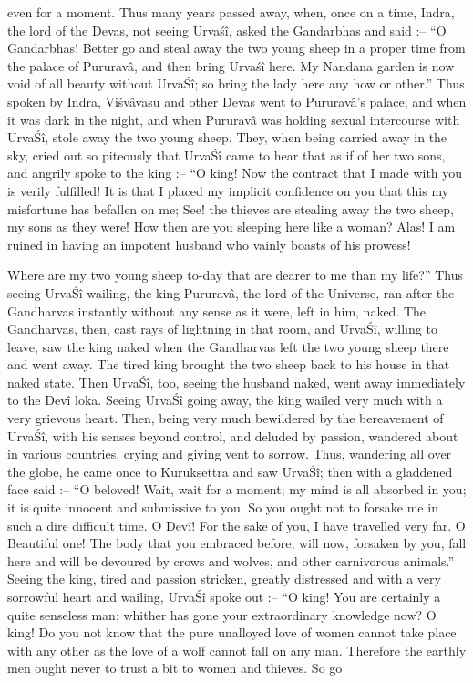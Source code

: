 even for a moment. Thus many years passed away, when, once on a time, Indra, the lord of the Devas, not seeing Urva\'s\^i, asked the Gandarbhas and said :-- ``O Gandarbhas! Better go and steal away the two young sheep in a proper time from the palace of Pururav\^a, and then bring Urva\'s\^i here. My Nandana garden is now void of all beauty without Urva\'S\^i; so bring the lady here any how or other.'' Thus spoken by Indra, Vi\'sv\^avasu and other Devas went to Pururav\^a's palace; and when it was dark in the night, and when Pururav\^a was holding sexual intercourse with Urva\'S\^i, stole away the two young sheep. They, when being carried away in the sky, cried out so piteously that Urva\'S\^i came to hear that as if of her two sons, and angrily spoke to the king :-- ``O king! Now the contract that I made with you is verily fulfilled! It is that I placed my implicit confidence on you that this my misfortune has befallen on me; See! the thieves are stealing away the two sheep, my sons as they were! How then are you sleeping here like a woman? Alas! I am ruined in having an impotent husband who vainly boasts of his prowess!

Where are my two young sheep to-day that are dearer to me than my life?'' Thus seeing Urva\'S\^i wailing, the king Pururav\^a, the lord of the Universe, ran after the Gandharvas instantly without any sense as it were, left in him, naked. The Gandharvas, then, cast rays of lightning in that room, and Urva\'S\^i, willing to leave, saw the king naked when the Gandharvas left the two young sheep there and went away. The tired king brought the two sheep back to his house in that naked state. Then Urva\'S\^i, too, seeing the husband naked, went away immediately to the Dev\^i loka. Seeing Urva\'S\^i going away, the king wailed very much with a very grievous heart. Then, being very much bewildered by the bereavement of Urva\'S\^i, with his senses beyond control, and deluded by passion, wandered about in various countries, crying and giving vent to sorrow. Thus, wandering all over the globe, he came once to Kuruksettra and saw Urva\'S\^i; then with a gladdened face said :-- ``O beloved! Wait, wait for a moment; my mind is all absorbed in you; it is quite innocent and submissive to you. So you ought not to forsake me in such a dire difficult time. O Dev\^i! For the sake of you, I have travelled very far. O Beautiful one! The body that you embraced before, will now, forsaken by you, fall here and will be devoured by crows and wolves, and other carnivorous animals.'' Seeing the king, tired and passion stricken, greatly distressed and with a very sorrowful heart and wailing, Urva\'S\^i spoke out :-- ``O king! You are certainly a quite senseless man; whither has gone your extraordinary knowledge now? O king! Do you not know that the pure unalloyed love of women cannot take place with any other as the love of a wolf cannot fall on any man. Therefore the earthly men ought never to trust a bit to women and thieves. So go

